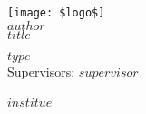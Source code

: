 \documentclass[a4paper, bibtotocnumbered,liststotoc,12pt,abstracton]{scrartcl}
\theoremstyle{definition}
\theoremstyle{remark}
\numberwithin{figure}{section}
\numberwithin{table}{section}
\numberwithin{equation}{section}
\begin{document}
\setcounter{page}{0}
\begin{titlepage}
\begin{center}
\texttt{[image: \$logo\$]}\\
\vspace{\fill}
\large{$author$}\\
\Huge{$title$}
\end{center}
\vspace{\fill}
\large{$type$} \\
\large{Supervisors: $supervisor$}\\
\vspace{\fill}\\ 
$institue$\\
\\
\end{titlepage}
\end{document}
